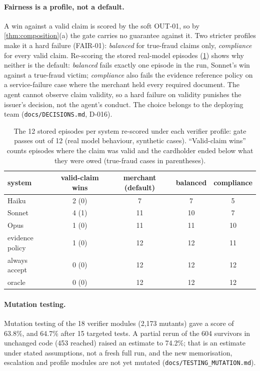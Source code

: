 \documentclass[11pt]{article}
\theoremstyle{definition}
\theoremstyle{remark}
\newcommand{\1}{\mathbf{1}}
\begin{document}
\paragraph{Fairness is a profile, not a default.} A win against a valid claim is scored by the soft OUT-01, so by \cref{thm:composition}(a) the gate carries no guarantee against it. Two stricter profiles make it a hard failure (FAIR-01): \emph{balanced} for true-fraud claims only, \emph{compliance} for every valid claim. Re-scoring the stored real-model episodes (\cref{tab:profiles}) shows why neither is the default: \emph{balanced} fails exactly one episode in the run, Sonnet's win against a true-fraud victim; \emph{compliance} also fails the evidence reference policy on a service-failure case where the merchant held every required document. The agent cannot observe claim validity, so a hard failure on validity punishes the issuer's decision, not the agent's conduct. The choice belongs to the deploying team (\texttt{docs/DECISIONS.md}, D-016).

\begin{table}[t]
\centering\small
\caption{The 12 stored episodes per system re-scored under each verifier profile: gate passes out of 12 (real model behaviour, synthetic cases). ``Valid-claim wins'' counts episodes where the claim was valid and the cardholder ended below what they were owed (true-fraud cases in parentheses).}\label{tab:profiles}
\begin{tabular}{@{}lcccc@{}}
\toprule
system & valid-claim wins & merchant (default) & balanced & compliance\\
\midrule
Haiku & 2 (0) & 7 & 7 & 5\\
Sonnet & 4 (1) & 11 & 10 & 7\\
Opus & 1 (0) & 11 & 11 & 10\\
evidence policy & 1 (0) & 12 & 12 & 11\\
always accept & 0 (0) & 12 & 12 & 12\\
oracle & 0 (0) & 12 & 12 & 12\\
\bottomrule
\end{tabular}
\end{table}

\paragraph{Mutation testing.} Mutation testing of the 18 verifier modules (2{,}173 mutants) gave a score of 63.8\%, and 64.7\% after 15 targeted tests. A partial rerun of the 604 survivors in unchanged code (453 reached) raised an estimate to 74.2\%; that is an estimate under stated assumptions, not a fresh full run, and the new memorisation, escalation and profile modules are not yet mutated (\texttt{docs/TESTING\_MUTATION.md}).
\end{document}
